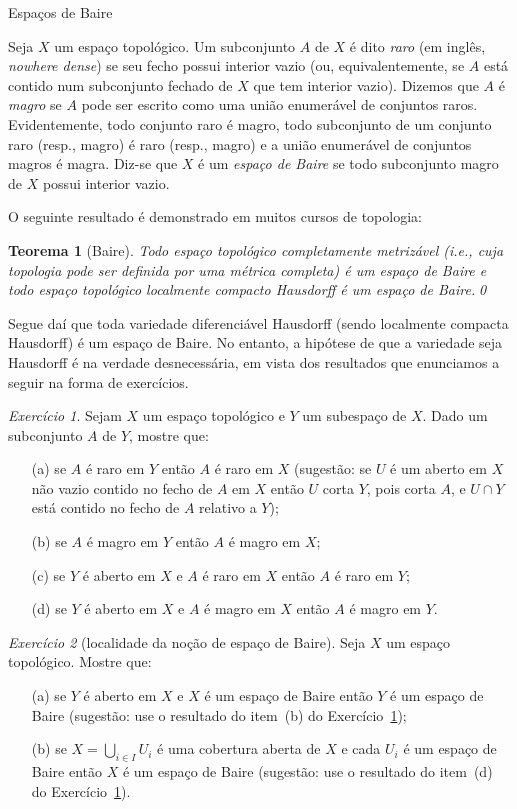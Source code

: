 \documentclass[oneside,11pt]{amsart}
\theoremstyle{remark}\newtheorem{exercise}{Exercício}[section]
\theoremstyle{plain}\newtheorem{teo}{Teorema}[section]
\theoremstyle{plain}\newtheorem{lem}[teo]{Lema}
\theoremstyle{plain}\newtheorem{prop}[teo]{Proposição}
\theoremstyle{definition}\newtheorem{defin}[teo]{Definição}
\theoremstyle{remark}\newtheorem{rem}[teo]{Observação}
\theoremstyle{definition}\newtheorem{example}[teo]{Exemplo}
\numberwithin{equation}{section}
\begin{document}
\begin{section}{Espaços de Baire}\label{sec:Baire}

Seja $X$ um espaço topológico. Um subconjunto $A$ de $X$ é dito {\em raro\/} (em inglês, {\em nowhere dense})
se seu fecho possui interior vazio (ou, equivalentemente, se $A$ está contido
num subconjunto fechado de $X$ que tem interior vazio). Dizemos que $A$ é {\em magro\/} se $A$ pode ser escrito como uma união enumerável de conjuntos raros.
Evidentemente, todo conjunto raro é magro, todo subconjunto de um conjunto raro (resp., magro) é raro (resp., magro) e a união enumerável de conjuntos magros
é magra. Diz-se que $X$ é um {\em espaço de Baire\/} se todo subconjunto magro de $X$ possui interior vazio.

O seguinte resultado é demonstrado em muitos cursos de topologia:
\begin{teo}[Baire]\label{thm:Baire}
Todo espaço topológico completamente metrizável (i.e., cuja topologia pode ser definida por uma métrica completa) é um espaço de Baire e todo espaço topológico
localmente compacto Hausdorff é um espaço de Baire.\qed
\end{teo}
Segue daí que toda variedade diferenciável Hausdorff (sendo localmente compacta Hausdorff) é um espaço de Baire. No entanto, a hipótese de que a variedade
seja Hausdorff é na verdade desnecessária, em vista dos resultados que enunciamos a seguir na forma de exercícios.

\begin{exercise}\label{exe:propmagroraro}
Sejam $X$ um espaço topológico e $Y$ um subespaço de $X$. Dado um subconjunto $A$ de $Y$, mostre que:
\begin{itemize}
\item[(a)] se $A$ é raro em $Y$ então $A$ é raro em $X$ (sugestão: se $U$ é um aberto em $X$ não vazio contido no fecho de $A$ em $X$ então $U$ corta
$Y$, pois corta $A$, e $U\cap Y$ está contido no fecho de $A$ relativo a $Y$);
\item[(b)] se $A$ é magro em $Y$ então $A$ é magro em $X$;
\item[(c)] se $Y$ é aberto em $X$ e $A$ é raro em $X$ então $A$ é raro em $Y$;
\item[(d)] se $Y$ é aberto em $X$ e $A$ é magro em $X$ então $A$ é magro em $Y$.
\end{itemize}
\end{exercise}

\begin{exercise}[localidade da noção de espaço de Baire]\label{exe:locBaire}
Seja $X$ um espaço topológico. Mostre que:
\begin{itemize}
\item[(a)] se $Y$ é aberto em $X$ e $X$ é um espaço de Baire então $Y$ é um espaço de Baire (sugestão: use o resultado do item~(b) do Exercício~\ref{exe:propmagroraro});
\item[(b)] se $X=\bigcup_{i\in I}U_i$ é uma cobertura aberta de $X$ e cada $U_i$ é um espaço de Baire então $X$ é um espaço de Baire (sugestão:
use o resultado do item~(d) do Exercício~\ref{exe:propmagroraro}).
\end{itemize}
\end{exercise}


\end{section}
\end{document}
